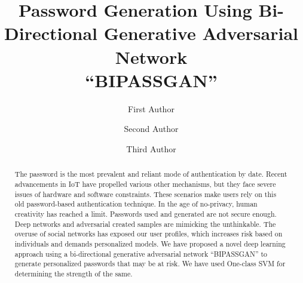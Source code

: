 \documentclass[runningheads]{llncs}
\newcommand{\quotes}[1]{``#1''}
\begin{document}
%
\title{Password Generation Using Bi-Directional Generative Adversarial Network\\ \quotes{BIPASSGAN}}
%
%
\author{First Author \and
Second Author \and
Third Author}
%
%
%
\maketitle              %
%
\begin{abstract}
The password is the most prevalent and reliant mode of authentication by date. Recent advancements in IoT have propelled various other mechanisms, but they face severe issues of hardware and software constraints. These scenarios make users rely on this old password-based authentication technique. In the age of no-privacy, human creativity has reached a limit. Passwords used and generated are not secure enough. Deep networks and adversarial created samples are mimicking the unthinkable. The overuse of social networks has exposed our user profiles, which increases risk based on individuals and demands personalized models. We have proposed a novel deep learning approach using a bi-directional generative adversarial network  \quotes{BIPASSGAN} to generate personalized passwords that may be at risk. We have used One-class SVM for determining the strength of the same.

\end{abstract}
%
%
%
\end{document}

